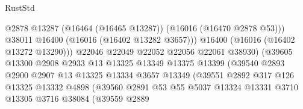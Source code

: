 \begin{lexlean}{RustStd}
\begin{coremodule}
                                            @2878
                                            @13287
                                            (@16464 (@16465 @13287))
                                            (@16016 (@16470 @2878 @53)))
                                          @38011
                                          @16400
                                          (@16016 (@16402 @13282 @3657)))
                                        @16400
                                        (@16016 (@16402 @13272 @13290)))
                                      @22046
                                      @22049
                                      @22052
                                      @22056
                                      @22061
                                      @38930)
                                    (@39605
                                      @13300
                                      @2908
                                      @2933
                                      @13
                                      @13325
                                      @13349
                                      @13375
                                      @13399
                                      (@39540
                                        @2893
                                        @2900
                                        @2907
                                        @13
                                        @13325
                                        @13334
                                        @3657
                                        @13349
                                        (@39551
                                          @2892
                                          @317
                                          @126
                                          @13325
                                          @13332
                                          @4898
                                          (@39560
                                            @2891
                                            @53
                                            @55
                                            @5037
                                            @13324
                                            @13331
                                            @3710
                                            @13305
                                            @3716
                                            @38084
                                            (@39559
                                              @2889

\end{coremodule}
\end{lexlean}
